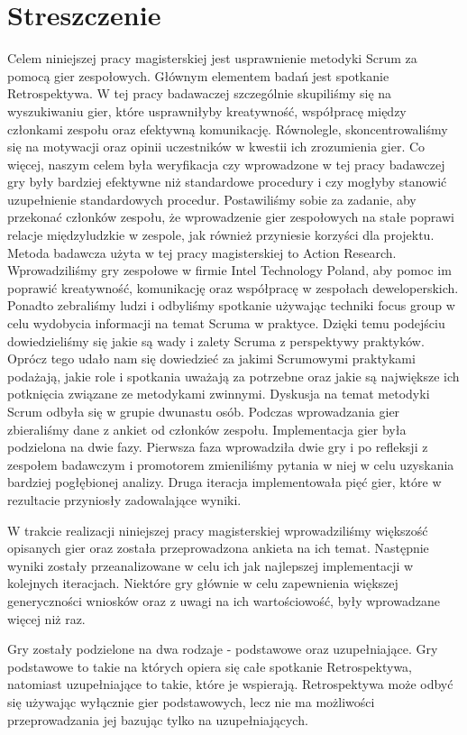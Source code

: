\chapter*{Streszczenie}

\tab Celem niniejszej pracy magisterskiej jest usprawnienie metodyki Scrum za pomocą gier zespołowych. Głównym elementem badań jest spotkanie Retrospektywa. W tej pracy badawaczej szczególnie skupiliśmy się na wyszukiwaniu gier, które usprawniłyby kreatywność, współpracę między członkami zespołu oraz efektywną komunikację. Równolegle, skoncentrowaliśmy się na motywacji oraz opinii uczestników w kwestii ich zrozumienia gier. Co więcej, naszym celem była weryfikacja czy wprowadzone w tej pracy badawczej gry były bardziej efektywne niż standardowe procedury i czy mogłyby stanowić uzupełnienie standardowych procedur. Postawiliśmy sobie za zadanie, aby przekonać członków zespołu, że wprowadzenie gier zespołowych na stałe poprawi relacje międzyludzkie w zespole, jak również przyniesie korzyści dla projektu. Metoda badawcza użyta w tej pracy magisterskiej to Action Research. Wprowadziliśmy gry zespołowe w firmie Intel Technology Poland, aby pomoc im poprawić kreatywność, komunikację oraz współpracę w zespołach deweloperskich. Ponadto zebraliśmy ludzi i odbyliśmy spotkanie używając techniki focus group w celu wydobycia informacji na temat Scruma w praktyce. Dzięki temu podejściu dowiedzieliśmy się jakie są wady i zalety Scruma z perspektywy praktyków. Oprócz tego udało nam się dowiedzieć za jakimi Scrumowymi praktykami podażają, jakie role i spotkania uważają za potrzebne oraz jakie są największe ich potknięcia związane ze metodykami zwinnymi. Dyskusja na temat metodyki Scrum odbyła się w grupie dwunastu osób. Podczas wprowadzania gier zbieraliśmy dane z ankiet od członków zespołu. Implementacja gier była podzielona na dwie fazy. Pierwsza faza wprowadziła dwie gry i po refleksji z zespołem badawczym i promotorem zmieniliśmy pytania w niej w celu uzyskania bardziej pogłębionej analizy. Druga iteracja implementowała pięć gier, które w rezultacie przyniosły zadowalające wyniki.

\tab W trakcie realizacji niniejszej pracy magisterskiej wprowadziliśmy większość opisanych gier oraz została przeprowadzona ankieta na ich temat. Następnie wyniki zostały przeanalizowane w celu ich jak najlepszej implementacji w kolejnych iteracjach. Niektóre gry głównie w celu zapewnienia większej generyczności wniosków oraz z uwagi na ich wartościowość, były wprowadzane więcej niż raz.

\tab Gry zostały podzielone na dwa rodzaje - podstawowe oraz uzupełniające. Gry podstawowe to takie na których opiera się całe spotkanie Retrospektywa, natomiast uzupełniające to takie, które je wspierają. Retrospektywa może odbyć się używając wyłącznie gier podstawowych, lecz nie ma możliwości przeprowadzania jej bazując tylko na uzupełniających.

